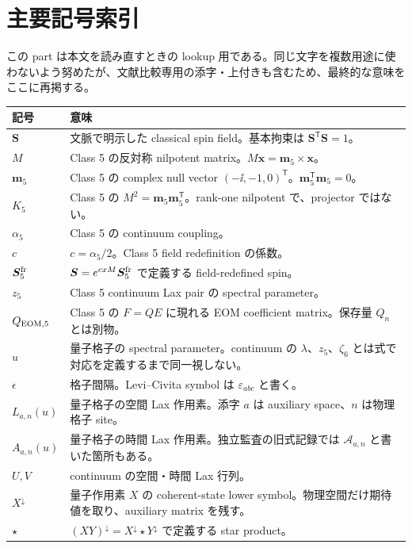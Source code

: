 \part{主要記号索引}
\label{part:index}
この part は本文を読み直すときの lookup 用である。同じ文字を複数用途に使わないよう努めたが、文献比較専用の添字・上付きも含むため、最終的な意味をここに再掲する。

\small
\begin{longtable}{L{31mm}L{111mm}}
\toprule
記号 & 意味\\
\midrule\endhead
\bottomrule\endfoot
$\boldsymbol S$ & 文脈で明示した classical spin field。基本拘束は $\boldsymbol S^{\mathsf T}\boldsymbol S=1$。\\
$M$ & Class 5 の反対称 nilpotent matrix。$M\boldsymbol x=\boldsymbol m_5\times\boldsymbol x$。\\
$\boldsymbol m_5$ & Class 5 の complex null vector $(-\ii,-1,0)^{\mathsf T}$。$\boldsymbol m_5^{\mathsf T}\boldsymbol m_5=0$。\\
$K_5$ & Class 5 の $M^2=\boldsymbol m_5\boldsymbol m_5^{\mathsf T}$。rank-one nilpotent で、projector ではない。\\
$\alpha_5$ & Class 5 の continuum coupling。\\
$c$ & $c=\alpha_5/2$。Class 5 field redefinition の係数。\\
$\boldsymbol S_5^{\rm fr}$ & $\boldsymbol S=e^{cxM}\boldsymbol S_5^{\rm fr}$ で定義する field-redefined spin。\\
$z_5$ & Class 5 continuum Lax pair の spectral parameter。\\
$Q_{{\rm EOM},5}$ & Class 5 の $F=QE$ に現れる EOM coefficient matrix。保存量 $Q_n$ とは別物。\\
$u$ & 量子格子の spectral parameter。continuum の $\lambda$、$z_5$、$\zeta_6$ とは式で対応を定義するまで同一視しない。\\
$\epsilon$ & 格子間隔。Levi--Civita symbol は $\varepsilon_{abc}$ と書く。\\
$L_{a,n}(u)$ & 量子格子の空間 Lax 作用素。添字 $a$ は auxiliary space、$n$ は物理格子 site。\\
$A_{a,n}(u)$ & 量子格子の時間 Lax 作用素。独立監査の旧式記録では $\mathcal A_{a,n}$ と書いた箇所もある。\\
$U,V$ & continuum の空間・時間 Lax 行列。\\
$X^\downarrow$ & 量子作用素 $X$ の coherent-state lower symbol。物理空間だけ期待値を取り、auxiliary matrix を残す。\\
$\star$ & $(XY)^\downarrow=X^\downarrow\star Y^\downarrow$ で定義する star product。\\

\end{longtable}
